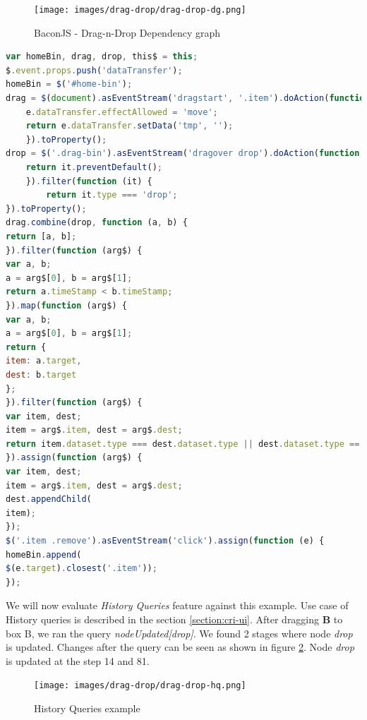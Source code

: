 \begin{figure}[!h]
	\centering
	\texttt{[image: images/drag-drop/drag-drop-dg.png]}
	\caption{BaconJS - Drag-n-Drop Dependency graph}
	\label{fig:drag-drop-dg}
\end{figure}


\begin{lstlisting}[language=JavaScript, caption=BaconJS - Drag-n-Drop Example, label={lst:drag-drop-code}]
var homeBin, drag, drop, this$ = this;
$.event.props.push('dataTransfer');
homeBin = $('#home-bin');
drag = $(document).asEventStream('dragstart', '.item').doAction(function (e) {
	e.dataTransfer.effectAllowed = 'move';
	return e.dataTransfer.setData('tmp', '');
	}).toProperty();
drop = $('.drag-bin').asEventStream('dragover drop').doAction(function (it) {
	return it.preventDefault();
	}).filter(function (it) {
		return it.type === 'drop';
}).toProperty();
drag.combine(drop, function (a, b) {
return [a, b];
}).filter(function (arg$) {
var a, b;
a = arg$[0], b = arg$[1];
return a.timeStamp < b.timeStamp;
}).map(function (arg$) {
var a, b;
a = arg$[0], b = arg$[1];
return {
item: a.target,
dest: b.target
};
}).filter(function (arg$) {
var item, dest;
item = arg$.item, dest = arg$.dest;
return item.dataset.type === dest.dataset.type || dest.dataset.type == null;
}).assign(function (arg$) {
var item, dest;
item = arg$.item, dest = arg$.dest;
dest.appendChild(
item);
});
$('.item .remove').asEventStream('click').assign(function (e) {
homeBin.append(
$(e.target).closest('.item'));
});
\end{lstlisting}

We will now evaluate \textit{History Queries} feature against this example. Use case of History queries is described in the section \ref{section:cri-ui}.
After dragging \textbf{B} to box B, we ran the query \textit{nodeUpdated[drop]}. We found 2 stages where node \textit{drop} is updated. Changes after the query can be seen as shown in figure \ref{fig:drag-drop-hq}. Node \textit{drop} is updated at the step 14 and 81.  

\begin{figure}[!h]
	\centering
	\texttt{[image: images/drag-drop/drag-drop-hq.png]}
	\caption{History Queries example}
	\label{fig:drag-drop-hq}
\end{figure}

